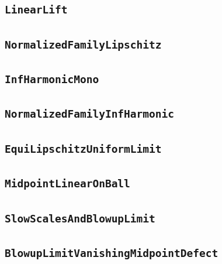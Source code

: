 \documentclass[11pt]{amsart}
\theoremstyle{definition}
\begin{document}
\subsection{\texorpdfstring{\texttt{LinearLift}}{LinearLift}}\label{node:LinearLift}


\subsection{\texorpdfstring{\texttt{NormalizedFamilyLipschitz}}{NormalizedFamilyLipschitz}}\label{node:NormalizedFamilyLipschitz}


\subsection{\texorpdfstring{\texttt{InfHarmonicMono}}{InfHarmonicMono}}\label{node:InfHarmonicMono}


\subsection{\texorpdfstring{\texttt{NormalizedFamilyInfHarmonic}}{NormalizedFamilyInfHarmonic}}\label{node:NormalizedFamilyInfHarmonic}


\subsection{\texorpdfstring{\texttt{EquiLipschitzUniformLimit}}{EquiLipschitzUniformLimit}}\label{node:EquiLipschitzUniformLimit}


\subsection{\texorpdfstring{\texttt{MidpointLinearOnBall}}{MidpointLinearOnBall}}\label{node:MidpointLinearOnBall}


\subsection{\texorpdfstring{\texttt{SlowScalesAndBlowupLimit}}{SlowScalesAndBlowupLimit}}\label{node:SlowScalesAndBlowupLimit}


\subsection{\texorpdfstring{\texttt{BlowupLimitVanishingMidpointDefect}}{BlowupLimitVanishingMidpointDefect}}\label{node:BlowupLimitVanishingMidpointDefect}

\end{document}

